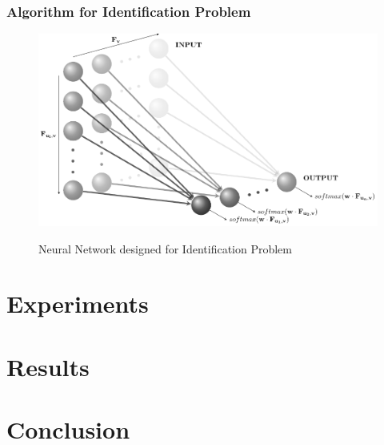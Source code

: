 \documentclass[12pt]{article}
\begin{document}
    \subsubsection{Algorithm for Identification Problem}
    \begin{figure}[H]
        \caption{Neural Network designed for Identification Problem}
        \centering
        \includegraphics[width=\textwidth]{weights_net}
        \label{fig:Neural Network designed for Identification Problem}
    \end{figure}
    \section{Experiments}
    
    \section{Results}
    \section{Conclusion}
    
    \blindtext
    
    
\end{document}
